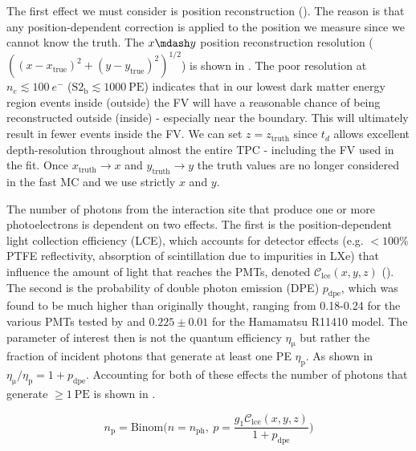 The first effect we must consider is position reconstruction ().  The reason is that
any position-dependent correction is applied to the position we measure since we cannot know the truth.  The $x \mdash y$ position
reconstruction resolution ($((x - x_{\mathrm{true}})^2 + (y - y_{\mathrm{true}})^2)^{1/2}$) is shown in
.  The poor resolution at
$n_e \lesssim 100\ e^-$ ($\mathrm{S2_b} \lesssim 1000\ \mathrm{PE}$) indicates that in our lowest dark matter energy region events inside
(outside) the FV will have a reasonable chance of being reconstructed outside (inside) - especially near the boundary.  This will
ultimately result in fewer events inside the FV.  We can set $z = z_{\mathrm{truth}}$ since $t_d$ allows excellent depth-resolution
throughout almost the entire TPC - including the FV used in the fit.  Once $x_{\mathrm{truth}} \rightarrow x$ and
$y_{\mathrm{truth}} \rightarrow y$ the truth values are no longer considered in the fast MC and we use strictly $x$ and $y$.


The number of photons from the interaction site that produce one or more photoelectrons is dependent on two effects.  The first is
the position-dependent light collection efficiency (LCE), which accounts for detector effects (e.g. $<100\%$ PTFE reflectivity,
absorption of
scintillation due to impurities in LXe) that influence the amount of light that reaches the PMTs, denoted $\mathcal{C}_{\mathrm{lce}}(x, y, z)$
().  The second is the probability of double photon emission (DPE) $p_{\mathrm{dpe}}$, which was found
to be much higher than originally thought, ranging from 0.18-0.24 for the various PMTs tested by  and $0.225 \pm 0.01$
for the Hamamatsu R11410 model.  The parameter of interest then is not the quantum efficiency $\eta_{\mathrm{\mu}}$ but rather the
fraction of incident photons that generate at least one PE $\eta_{\mathrm{p}}$.  As shown in 
$\eta_{\mathrm{\mu}} / \eta_{\mathrm{p}} = 1 + p_{\mathrm{dpe}}$.  Accounting for both of these effects the number of photons that
generate $\geq 1\ \mathrm{PE}$ is shown in .

\begin{equation}
n_{\mathrm{p}} = \mathrm{Binom} \bigg( n = n_{\mathrm{ph}},\ p = \frac{g_1 \mathcal{C}_{\mathrm{lce}}(x, y, z)}{1 + p_{\mathrm{dpe}}} \bigg)
\label{eq:er_nr_calibrations_parameter_determ_det_phys_npe}
\end{equation}

